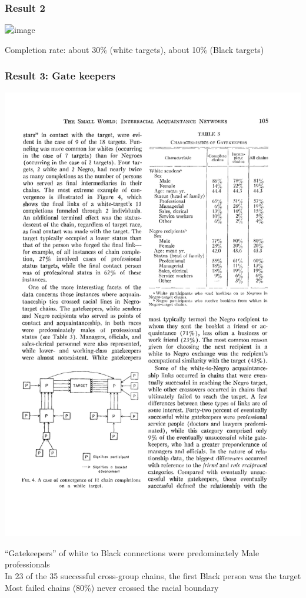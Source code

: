 \documentclass[aspectratio=169]{beamer}
\begin{document}
\begin{frame}
\frametitle{Result 2}

\begin{center}
\includegraphics<1>[width=0.8\textwidth]{figures/korte_aquaintance_1970_tab2}
\end{center}

\vfill
Completion rate: about 30\% (white targets), about 10\% (Black targets)


\end{frame}
\begin{frame}
\frametitle{Result 3: Gate keepers}

\begin{center}
\includegraphics[height=0.6\textheight]{figures/korte_aquaintance_1970_tab3}
\end{center}

\vfill
``Gatekeepers'' of white to Black connections were predominately Male professionals\\
In 23 of the 35 successful cross-group chains, the first Black person was the target\\
Most failed chains (80\%) never crossed the racial boundary\\

\end{frame}
\end{document}

